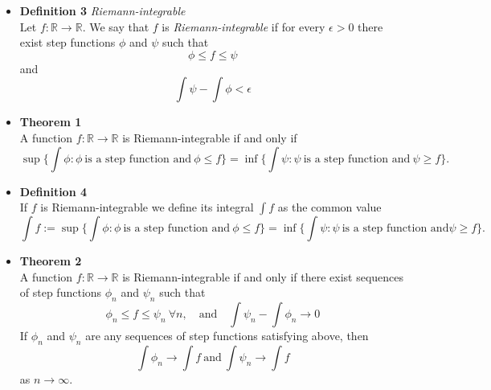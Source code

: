\documentclass[11pt,a4paper]{article}
\begin{document}
\begin{itemize}
    \item \textbf{Definition 3} \emph{Riemann-integrable} \\
        Let $f : \mathbb{R} \to \mathbb{R}$.
        We say that $f$ is \emph{Riemann-integrable} if for every $\epsilon > 0$
        there exist step functions $\phi$ and $\psi$ such that
        \[
            \phi \leq f \leq \psi
        \]
        and
        \[
            \int \psi - \int \phi < \epsilon
        \]

    \item \textbf{Theorem 1} \\
        A function $f : \mathbb{R} \to \mathbb{R}$ is Riemann-integrable if and only if
        \[
            \sup \{ \int \phi : \phi \ \text{is a step function and} \ \phi \leq f \} =
            \inf \{ \int \psi : \psi \ \text{is a step function and} \ \psi \geq f \}.
        \]

    \item \textbf{Definition 4} \\
        If $f$ is Riemann-integrable we define its integral $\int f$ as the common value
        \[
            \int f := \sup \{ \int \phi : \phi \ \text{is a step function and} \ \phi \leq f \}
            = \inf \{ \int \psi : \psi \ \text{is a step function and} \psi \geq f \}.
        \]

    \item \textbf{Theorem 2} \\
        A function $f : \mathbb{R} \to \mathbb{R}$ is Riemann-integrable if and only if there
        exist sequences of step functions $\phi_n$ and $\psi_n$ such that
        \[
            \phi_n \leq f \leq \psi_n \ \forall n, \quad \text{and} \quad
            \int \psi_n - \int \phi_n \to 0
        \]
        If $\phi_n$ and $\psi_n$ are any sequences of step functions satisfying above, then
        \[
            \int \phi_n \to \int f \ \text{and} \ \int \psi_n \to \int f
        \]
        as $n \to \infty$.


\end{itemize}
\end{document}
